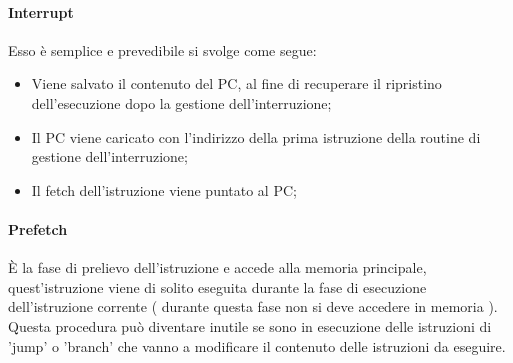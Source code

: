 \documentclass[arch.tex]{subfiles}
\begin{document}
\paragraph{Interrupt}%
\label{par:interrupt}
Esso è semplice e prevedibile si svolge come segue:

\begin{itemize}
	\item Viene salvato il contenuto del PC, al fine di recuperare il ripristino dell'esecuzione dopo
		la gestione dell'interruzione;
	\item Il PC viene caricato con l'indirizzo della prima istruzione della routine di gestione 
		dell'interruzione;
	\item Il fetch dell'istruzione viene puntato al PC;
\end{itemize}

\paragraph{Prefetch}%
\label{par:prefetch}

È la fase di prelievo dell'istruzione e accede alla memoria principale, quest'istruzione viene di solito
eseguita durante la fase di esecuzione dell'istruzione corrente ( durante questa fase non si deve accedere in memoria ).\\
Questa procedura può diventare inutile se sono in esecuzione delle istruzioni di 'jump' o 'branch' che vanno
a modificare il contenuto delle istruzioni da eseguire.
\end{document}
